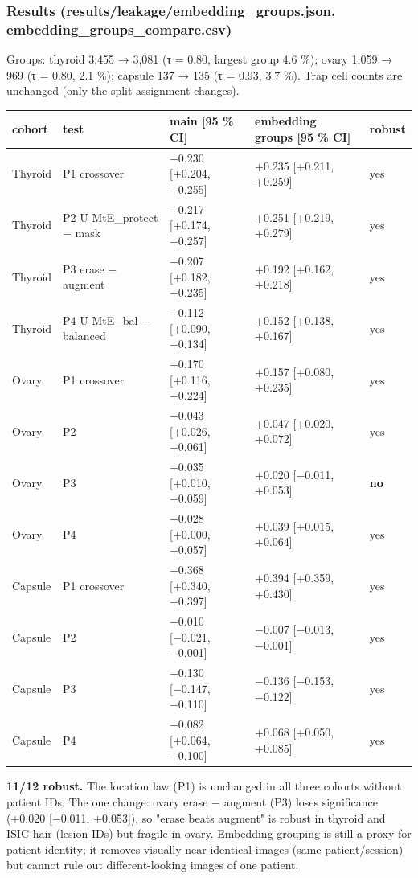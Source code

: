 {\subsubsection{Results (results/leakage/embedding\_groups.json, embedding\_groups\_compare.csv)}\label{results-resultsleakageembedding_groupsjson-embedding_groups_comparecsv}

Groups: thyroid 3,455 → 3,081 (τ = 0.80, largest group 4.6 \%); ovary 1,059 → 969 (τ = 0.80, 2.1 \%); capsule 137 → 135
(τ = 0.93, 3.7 \%). Trap cell counts are unchanged (only the split assignment changes).

{ %
\begin{longtable}[]{@{}lllll@{}}
\toprule\noalign{}
cohort & test & main {[}95 \% CI{]} & embedding groups {[}95 \% CI{]} & robust \\
\midrule\noalign{}
\endhead
\bottomrule\noalign{}
\endlastfoot
Thyroid & P1 crossover & +0.230 {[}+0.204, +0.255{]} & +0.235 {[}+0.211, +0.259{]} & yes \\
Thyroid & P2 U-MtE\_protect − mask & +0.217 {[}+0.174, +0.257{]} & +0.251 {[}+0.219, +0.279{]} & yes \\
Thyroid & P3 erase − augment & +0.207 {[}+0.182, +0.235{]} & +0.192 {[}+0.162, +0.218{]} & yes \\
Thyroid & P4 U-MtE\_bal − balanced & +0.112 {[}+0.090, +0.134{]} & +0.152 {[}+0.138, +0.167{]} & yes \\
Ovary & P1 crossover & +0.170 {[}+0.116, +0.224{]} & +0.157 {[}+0.080, +0.235{]} & yes \\
Ovary & P2 & +0.043 {[}+0.026, +0.061{]} & +0.047 {[}+0.020, +0.072{]} & yes \\
Ovary & P3 & +0.035 {[}+0.010, +0.059{]} & +0.020 {[}−0.011, +0.053{]} & \textbf{no} \\
Ovary & P4 & +0.028 {[}+0.000, +0.057{]} & +0.039 {[}+0.015, +0.064{]} & yes \\
Capsule & P1 crossover & +0.368 {[}+0.340, +0.397{]} & +0.394 {[}+0.359, +0.430{]} & yes \\
Capsule & P2 & −0.010 {[}−0.021, −0.001{]} & −0.007 {[}−0.013, −0.001{]} & yes \\
Capsule & P3 & −0.130 {[}−0.147, −0.110{]} & −0.136 {[}−0.153, −0.122{]} & yes \\
Capsule & P4 & +0.082 {[}+0.064, +0.100{]} & +0.068 {[}+0.050, +0.085{]} & yes \\
\end{longtable}
}

\textbf{11/12 robust.} The location law (P1) is unchanged in all three cohorts without patient IDs. The one change: ovary
erase − augment (P3) loses significance (+0.020 {[}−0.011, +0.053{]}), so "erase beats augment" is robust in thyroid and
ISIC hair (lesion IDs) but fragile in ovary. Embedding grouping is still a proxy for patient identity; it removes
visually near-identical images (same patient/session) but cannot rule out different-looking images of one patient.

}

